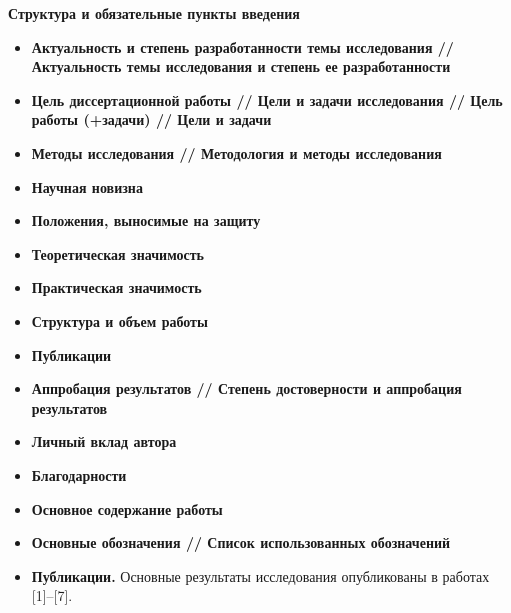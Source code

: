 \documentclass[../main.tex]{subfiles}
\begin{document}
\pagebreak
\textbf{Структура и обязательные пункты введения}
\begin{itemize}
\item \textbf{Актуальность и степень разработанности темы исследования // Актуальность темы исследования и степень ее разработанности}
\item \textbf{Цель диссертационной работы // Цели и задачи исследования // Цель работы (+задачи) // Цели и задачи}
\item \textbf{Методы исследования // Методология и методы исследования}
\item \textbf{Научная новизна}
\item \textbf{Положения, выносимые на защиту}
\item \textbf{Теоретическая значимость}
\item \textbf{Практическая значимость}
\item \textbf{Структура и объем работы}
\item \textbf{Публикации}
\item \textbf{Аппробация результатов // Степень достоверности и аппробация результатов}
\item \textbf{Личный вклад автора}
\item \textbf{Благодарности}
\item \textbf{Основное содержание работы}
\item \textbf{Основные обозначения // Список использованных обозначений}
\item \textbf{Публикации.} Основные результаты исследования опубликованы в работах [1]--[7].
\end{itemize}
\end{document}
